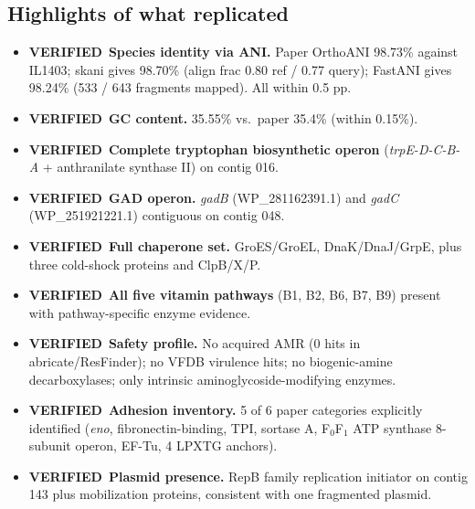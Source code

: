 \documentclass[11pt,letterpaper]{article}
\newcommand{\verified}{\textcolor{green!55!black}{\textbf{VERIFIED}}}
\begin{document}
\subsection{Highlights of what replicated}
\begin{itemize}[leftmargin=1.4em]
\item \verified\ \textbf{Species identity via ANI.} Paper OrthoANI 98.73\%
against IL1403; skani gives 98.70\% (align frac 0.80 ref / 0.77 query);
FastANI gives 98.24\% (533 / 643 fragments mapped). All within 0.5 pp.
\item \verified\ \textbf{GC content.} 35.55\% vs.\ paper 35.4\%
(within 0.15\%).
\item \verified\ \textbf{Complete tryptophan biosynthetic operon}
(\emph{trpE-D-C-B-A} + anthranilate synthase II) on contig 016.
\item \verified\ \textbf{GAD operon.} \emph{gadB}
(WP\_281162391.1) and \emph{gadC} (WP\_251921221.1) contiguous on contig 048.
\item \verified\ \textbf{Full chaperone set.} GroES/GroEL, DnaK/DnaJ/GrpE,
plus three cold-shock proteins and ClpB/X/P.
\item \verified\ \textbf{All five vitamin pathways} (B1, B2, B6, B7, B9)
present with pathway-specific enzyme evidence.
\item \verified\ \textbf{Safety profile.} No acquired AMR
(0 hits in abricate/ResFinder); no VFDB virulence hits; no biogenic-amine
decarboxylases; only intrinsic aminoglycoside-modifying enzymes.
\item \verified\ \textbf{Adhesion inventory.} 5 of 6 paper categories
explicitly identified (\emph{eno}, fibronectin-binding, TPI, sortase A,
F$_0$F$_1$ ATP synthase 8-subunit operon, EF-Tu, 4 LPXTG anchors).
\item \verified\ \textbf{Plasmid presence.} RepB family replication
initiator on contig 143 plus mobilization proteins, consistent with
one fragmented plasmid.
\end{itemize}
\end{document}
